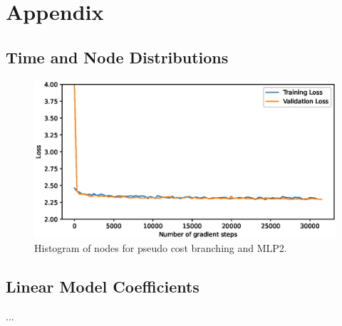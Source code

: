 \chapter{Appendix}\label{cha:appendix-my-appendix}
%

\section{Time and Node Distributions}\label{sec:distributions}
\begin{figure}[h]
    \centering
    \includegraphics[width=\textwidth]{img/loss70.eps}
    \caption{Histogram of nodes for pseudo cost branching and MLP2.}
    \label{fig:node_histogram}
\end{figure}


\section{Linear Model Coefficients}\label{sec:coefficients}
...
